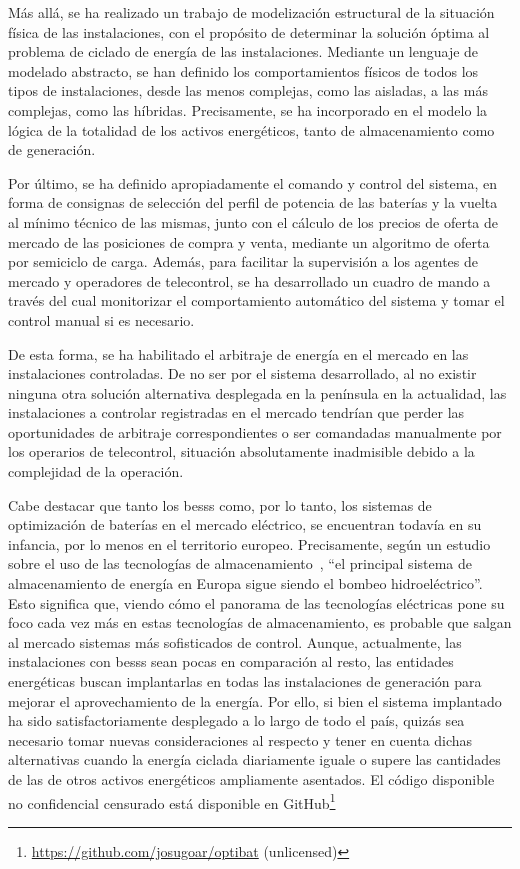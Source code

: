 Más allá, se ha realizado un trabajo de modelización estructural de la situación física de las instalaciones, con el propósito de determinar la solución óptima al problema de ciclado de energía de las instalaciones. Mediante un lenguaje de modelado abstracto, se han definido los comportamientos físicos de todos los tipos de instalaciones, desde las menos complejas, como las aisladas, a las más complejas, como las híbridas. Precisamente, se ha incorporado en el modelo la lógica de la totalidad de los activos energéticos, tanto de almacenamiento como de generación.

Por último, se ha definido apropiadamente el comando y control del sistema, en forma de consignas de selección del perfil de potencia de las baterías y la vuelta al mínimo técnico de las mismas, junto con el cálculo de los precios de oferta de mercado de las posiciones de compra y venta, mediante un algoritmo de oferta por semiciclo de carga. Además, para facilitar la supervisión a los agentes de mercado y operadores de telecontrol, se ha desarrollado un cuadro de mando a través del cual monitorizar el comportamiento automático del sistema y tomar el control manual si es necesario.

De esta forma, se ha habilitado el arbitraje de energía en el mercado en las instalaciones controladas. De no ser por el sistema desarrollado, al no existir ninguna otra solución alternativa desplegada en la península en la actualidad, las instalaciones a controlar registradas en el mercado tendrían que perder las oportunidades de arbitraje correspondientes o ser comandadas manualmente por los operarios de telecontrol, situación absolutamente inadmisible debido a la complejidad de la operación.

Cabe destacar que tanto los \glspl{bess} como, por lo tanto, los sistemas de optimización de baterías en el mercado eléctrico, se encuentran todavía en su infancia, por lo menos en el territorio europeo. Precisamente, según un estudio sobre el uso de las tecnologías de almacenamiento~\cite{hu2022potential}, ``el principal sistema de almacenamiento de energía en Europa sigue siendo el bombeo hidroeléctrico''. Esto significa que, viendo cómo el panorama de las tecnologías eléctricas pone su foco cada vez más en estas tecnologías de almacenamiento, es probable que salgan al mercado sistemas más sofisticados de control. Aunque, actualmente, las instalaciones con \glspl{bess} sean pocas en comparación al resto, las entidades energéticas buscan implantarlas en todas las instalaciones de generación para mejorar el aprovechamiento de la energía. Por ello, si bien el sistema implantado ha sido satisfactoriamente desplegado a lo largo de todo el país, quizás sea necesario tomar nuevas consideraciones al respecto y tener en cuenta dichas alternativas cuando la energía ciclada diariamente iguale o supere las cantidades de las de otros activos energéticos ampliamente asentados. El código disponible no confidencial censurado está disponible en GitHub\footnote{\url{https://github.com/josugoar/optibat} (unlicensed)}

